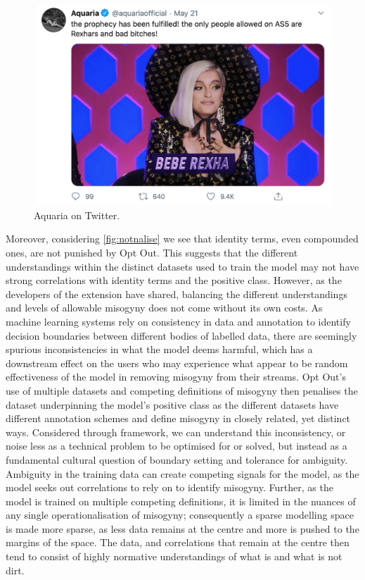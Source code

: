 \begin{figure}[!ht]
  \centering
  \includegraphics[scale=0.5]{aquaria.png}
  \caption{Aquaria on Twitter.}
  \label{fig:aquaria}
\end{figure}

Moreover, considering \autoref{fig:notnalise} we see that identity terms, even compounded ones, are not punished by Opt Out. This suggests that the different understandings within the distinct datasets used to train the model may not have strong correlations with identity terms and the positive class. However, as the developers of the extension have shared, balancing the different understandings and levels of allowable misogyny does not come without its own costs. As machine learning systems rely on consistency in data and annotation to identify decision boundaries between different bodies of labelled data, there are seemingly spurious inconsistencies in what the model deems harmful, which has a downstream effect on the users who may experience what appear to be random effectiveness of the model in removing misogyny from their streams. Opt Out's use of multiple datasets and competing definitions of misogyny then penalises the dataset underpinning the model's positive class as the different datasets have different annotation schemes and define misogyny in closely related, yet distinct ways.
Considered through \citet{Douglas:1966} framework, we can understand this inconsistency, or noise less as a technical problem to be optimised for or solved, but instead as a fundamental cultural question of boundary setting and tolerance for ambiguity. Ambiguity in the training data can create competing signals for the model, as the model seeks out correlations to rely on to identify misogyny. Further, as the model is trained on multiple competing definitions, it is limited in the nuances of any single operationalisation of misogyny; consequently a sparse modelling space is made more sparse, as less data remains at the centre and more is pushed to the margins of the space. The data, and correlations that remain at the centre then tend to consist of highly normative understandings of what is and what is not dirt.

